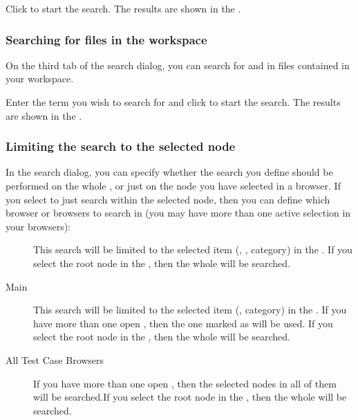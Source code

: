 Click  to start the search. The results are shown in the \gdsearchresultview{} . 


\subsubsection{Searching for files in the workspace}
\label{TasksSearchFiles}

On the third tab of the search dialog, you can search for and in files contained in your workspace.

Enter the term you wish to search for and click  to start the search. The results are shown in the \gdsearchresultview{} . 

\subsubsection{Limiting the search to the selected node}
\label{TasksSearchLimit}

In the search dialog, you can specify whether the search you define should be performed on the whole \gdproject{}, or just on the node you have selected in a browser. If you select to just search within the selected node, then you can define which browser or browsers to search in (you may have more than one active selection in your browsers):

\begin{description}
\item [\gdtestsuitebrowser{}]{This search will be limited to the selected item (\gdsuite{}, \gdjob{}, category) in the \gdtestsuitebrowser{}. If you select the root node in the \gdtestsuitebrowser{}, then the whole \gdtestsuitebrowser{} will be searched. }
\item [Main \gdtestcasebrowser{}]{This search will be limited to the selected item (\gdcase{}, category) in the \gdtestcasebrowser{}. If you have more than one \gdtestcasebrowser{} open , then the one marked as  will be used. If you select the root node in the \gdtestcasebrowser{}, then the whole \gdtestcasebrowser{} will be searched.}
\item [All Test Case Browsers]{If you have more than one \gdtestcasebrowser{} open , then the selected nodes in all of them will be searched.If you select the root node in the \gdtestcasebrowser{}, then the whole \gdtestcasebrowser{} will be searched.  }
\end{description}

